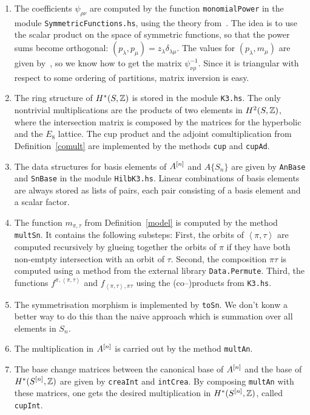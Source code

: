 \begin{enumerate}
 \item The coefficients $\psi_{\rho\nu}$ are computed by the function \verb|monomialPower| in the module \verb|SymmetricFunctions.hs|, using the theory from~\cite[Sect.~3.7]{Lascoux}. The idea is to use the scalar product on the space of symmetric functions, so that the power sums become orthogonal: $(p_\lambda,p_\mu) = z_\lambda \delta_{\lambda\mu}$. The values for $(p_\lambda,m_\mu)$ are given by~\cite[Lemma~3.7.1]{Lascoux}, so we know how to get the matrix $\psi_{\nu\rho}^{-1}$. Since it is triangular with respect to some ordering of partitions, matrix inversion is easy.
 \item The ring structure of $H^*(S,\mathbb{Z})$ is stored in the module \verb|K3.hs|. The only nontrivial multiplications are the products of two elements in $H^2(S,\mathbb{Z})$, where the intersection matrix is composed by the matrices for the hyperbolic and the $E_8$ lattice. The cup product and the adjoint comultiplication from Definition~\ref{comult} are implemented by the methods \verb|cup| and \verb|cupAd|.
 \item The data structures for basis elements of $A^{[n]}$ and $A\{S_n\}$ are given by \verb|AnBase| and \verb|SnBase| in the module \verb|HilbK3.hs|. Linear combinations of basis elements are always stored as lists of pairs, each pair consisting of a basis element and a scalar factor.
 \item The function $m_{\pi,\tau}$ from Definition~\ref{model} is computed by the method \verb|multSn|. It contains the following substeps: First, the orbits of $\left<\pi,\tau\right>$ are computed recursively by glueing together the orbits of $\pi$ if they have both non-emtpty intersection with an orbit of $\tau$. Second, the composition $\pi\tau$ is computed using a method from the external library \verb|Data.Permute|. Third, the functions $f^{\pi,\left<\pi,\tau\right>}$ and $f_{\left<\pi,\tau\right>,\pi\tau}$ using the (co--)products from \verb|K3.hs|.
 \item The symmetrisation morphism is implemented by \verb|toSn|. We don't konw a better way to do this than the naive approach which is summation over all elements in $S_n$.
 \item The multiplication in $A^{[n]}$ is carried out by the method \verb|multAn|.
 \item The base change matrices between the canonical base of $A^{[n]}$ and the base of $H^*(S^{[n]},\mathbb{Z})$ are given by \verb|creaInt| and \verb|intCrea|. By composing \verb|multAn| with these matrices, one gets the desired multiplication in $H^*(S^{[n]},\mathbb{Z})$, called \verb|cupInt|.
\end{enumerate}

